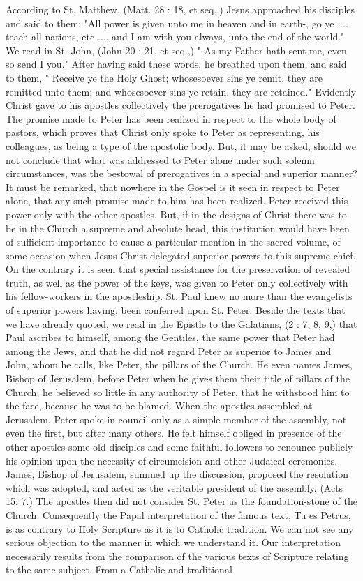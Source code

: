 According to St. Matthew, (Matt. 28 : 18, et seq.,) Jesus approached his disciples and said to them: "All power is given unto me in heaven and in earth-, go ye .... teach all nations, etc .... and I am with you always, unto the end of the world." We read in St. John, (John 20 : 21, et seq.,) " As my Father hath sent me, even so send I you." After having said these words, he breathed upon them, and said to them, " Receive ye the Holy Ghost; whosesoever sins ye remit, they are remitted unto them; and whosesoever sins ye retain, they are retained." Evidently Christ gave to his apostles collectively the prerogatives he had promised to Peter. The promise made to Peter has been realized in respect to the whole body of pastors, which proves that Christ only spoke to Peter as representing, his colleagues, as being a type of the apostolic body. But, it may be asked, should we not conclude that what was addressed to Peter alone under such solemn circumstances, was the bestowal of prerogatives in a special and superior manner? It must be remarked, that nowhere in the Gospel is it seen in respect to Peter alone, that any such promise made to him has been realized. Peter received this power only with the other apostles. But, if in the designs of Christ there was to be in the Church a supreme and absolute head, this institution would have been of sufficient importance to cause a particular mention in the sacred volume, of some occasion when Jesus Christ delegated superior powers to this supreme chief. On the contrary it is seen that special assistance for the preservation of revealed truth, as well as the power of the keys, was given to Peter only collectively with his fellow-workers in the apostleship. St. Paul knew no more than the evangelists of superior powers having, been conferred upon St. Peter. Beside the texts that we have already quoted, we read in the Epistle to the Galatians, (2 : 7, 8, 9,) that Paul ascribes to himself, among the Gentiles, the same power that Peter had among the Jews, and that he did not regard Peter as superior to James and John, whom he calls, like Peter, the pillars of the Church. He even names James, Bishop of Jerusalem, before Peter when he gives them their title of pillars of the Church; he believed so little in any authority of Peter, that he withstood him to the face, because he was to be blamed. When the apostles assembled at Jerusalem, Peter spoke in council only as a simple member of the assembly, not even the first, but after many others. He felt himself obliged in presence of the other apostles-some old disciples and some faithful followers-to renounce publicly his opinion upon the necessity of circumcision and other Judaical ceremonies. James, Bishop of Jerusalem, summed up the discussion, proposed the resolution which was adopted, and acted as the veritable president of the assembly. (Acts 15: 7.) The apostles then did not consider St. Peter as the foundation-stone of the Church. Consequently the Papal interpretation of the famous text, Tu es Petrus, is as contrary to Holy Scripture as it is to Catholic tradition. We can not see any serious objection to the manner in which we understand it. Our interpretation necessarily results from the comparison of the various texts of Scripture relating to the same subject. From a Catholic and traditional 